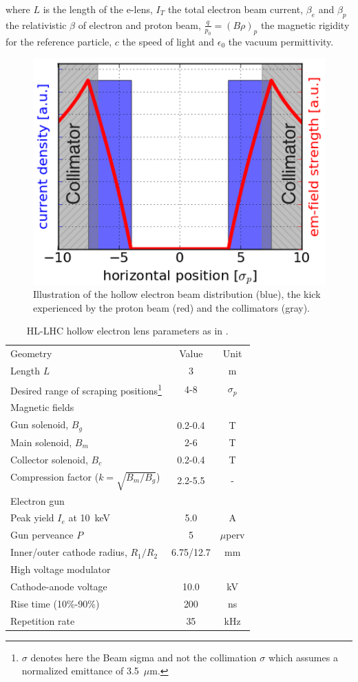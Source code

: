 \documentclass[%
 reprint,
 amsmath,amssymb,
 aps,
prstab,
]{revtex4-1}
\begin{document}
where $L$ is the length of the e-lens, $I_T$ the total electron beam current, $\beta_{e}$ and $\beta_{p}$ the relativistic $\beta$ of electron and proton beam, $\frac{q}{p_0}=\left(B\rho\right)_p$ the magnetic rigidity for the reference particle, $c$ the speed of light and $\epsilon_0$ the vacuum permittivity.
\begin{figure}[b]
	\includegraphics[width=0.8\linewidth]{hel_field}%
	\caption{\label{fig:hel_field} Illustration of the hollow electron beam distribution (blue), the kick experienced by the proton beam (red) and the collimators (gray).}
\end{figure}
\begin{table}[t]
	\caption{\label{tab:hel_param}%
		HL-LHC hollow electron lens parameters as in \cite{hel_cdr}.
	}
	\begin{ruledtabular}
		\begin{tabular}{lcc}
			Geometry & Value& Unit\\
			\colrule
		Length $L$    &  3 & m\\
		Desired range of scraping positions\footnote{$\sigma$ denotes here the Beam sigma and not the collimation $\sigma$ which assumes a normalized emittance of 3.5~$\mu$m.} & 4-8 &$\sigma_p$\\
		\colrule
		Magnetic fields & & \\
		\colrule
		Gun solenoid, $B_g$ & 0.2-0.4 & T\\
		Main solenoid, $B_m$ & 2-6 & T\\
		Collector solenoid, $B_c$ & 0.2-0.4 & T\\
		Compression factor ($k=\sqrt{B_m/B_g}$) & 2.2-5.5 & -\\
		\colrule
		Electron gun & & \\
		\colrule
		Peak yield $I_e$ at 10~keV & 5.0 & A\\
		Gun perveance $P$ & 5 & $\mu$perv\\
		Inner/outer cathode radius, $R_1/R_2$ & 6.75/12.7 & mm\\
		\colrule
		High voltage modulator & & \\
		\colrule
		Cathode-anode voltage & 10.0 & kV\\
		Rise time (10\%-90\%) & 200 & ns \\
		Repetition rate & 35 & kHz
		\end{tabular}
	\end{ruledtabular}
\end{table}
\end{document}

